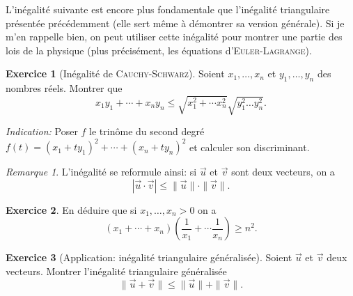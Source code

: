 \documentclass{article}
\theoremstyle{definition}
\newtheorem{exo}{Exercice}
\theoremstyle{remark}
\newtheorem{rem}[mydef]{Remarque}
\theoremstyle{plain}
\begin{document}
L'inégalité suivante est encore plus fondamentale que l'inégalité triangulaire présentée précédemment (elle sert même à démontrer sa version générale). Si je m'en rappelle bien, on peut utiliser cette inégalité pour montrer une partie des lois de la physique (plus précisément, les équations d'\textsc{Euler-Lagrange}).

\begin{exo}[Inégalité de \textsc{Cauchy-Schwarz}]
	Soient $x_1,\ldots,x_n$ et $y_1,\ldots,y_n$ des nombres réels. Montrer que
	\[ x_1y_1 + \cdots + x_ny_n \leq \sqrt{x_1^2+\cdots x_n^2}\sqrt{y_1^2\ldots y_n^2}. \]
	
	\textit{Indication:} Poser $f$ le trinôme du second degré $f(t) = (x_1 +ty_1)^2 + \cdots + (x_n +ty_n)^2$ et calculer son discriminant.
\end{exo}

\begin{rem}
	L'inégalité se reformule ainsi: si $\vec u$ et $\vec v$ sont deux vecteurs, on a 
	\[ |\vec u \cdot \vec v| \leq \|\vec u\|\cdot\|\vec v\|. \]
\end{rem}

\begin{exo}
	En déduire que si $x_1,\ldots,x_n>0$ on a
	\[ (x_1+\cdots+x_n)\left(\frac{1}{x_1}+\cdots\frac{1}{x_n}\right)
	\geq n^2. \]
\end{exo}

\begin{exo}[Application: inégalité triangulaire généralisée]\leavevmode
	Soient $\vec u$ et $\vec v$ deux vecteurs. Montrer l'inégalité triangulaire généralisée
	\[
	\|\vec u + \vec v\| \leq \|\vec u \| + \|\vec v\|.
	\]
\end{exo}
\end{document}
